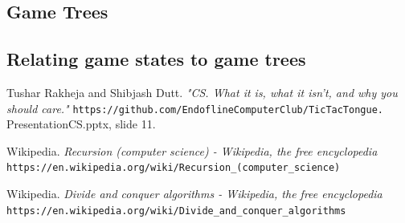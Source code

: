 \documentclass{article}
\begin{document}
\subsection{Game Trees}

\subsection{Relating game states to game trees}

\begin{thebibliography}{9}
 {
Tushar Rakheja and Shibjash Dutt.
\textit{"CS. What it is, what it isn't, and why you should care."}
\texttt{https://github.com/EndoflineComputerClub/TicTacTongue.}
\\PresentationCS.pptx, slide 11. }

Wikipedia.
\textit{Recursion (computer science) - Wikipedia, the free encyclopedia}
\texttt{https://en.wikipedia.org/wiki/Recursion\_(computer\_science)}

Wikipedia.
\textit{Divide and conquer algorithms - Wikipedia, the free encyclopedia}
\texttt{https://en.wikipedia.org/wiki/Divide\_and\_conquer\_algorithms}
\end{thebibliography}
\end{document}
